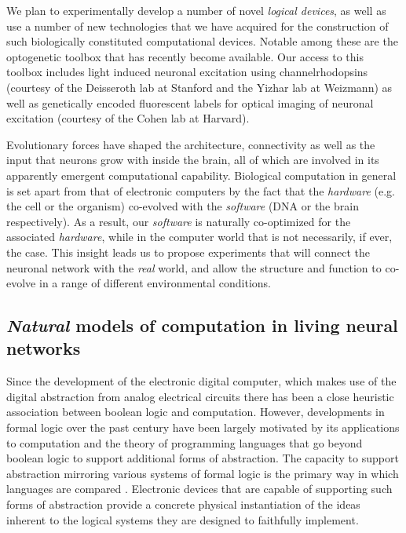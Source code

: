 We plan to experimentally develop a number of novel {\it logical devices}, as well as use a number of new technologies that we have acquired for the construction of such biologically constituted computational devices. Notable among these are the optogenetic toolbox that has recently become available. Our access to this toolbox includes light induced neuronal excitation using channelrhodopsins (courtesy of the Deisseroth lab at Stanford and the Yizhar lab at Weizmann) as well as genetically encoded fluorescent labels for optical imaging of neuronal excitation (courtesy of the Cohen lab at Harvard).

Evolutionary forces have shaped the architecture, connectivity as well as the input that neurons grow with inside the brain, all of which are involved in its apparently emergent computational capability. Biological computation in general is set apart from that of electronic computers by the fact that the {\it hardware} (e.g. the cell or the organism) co-evolved with the {\it software} (DNA or the brain respectively). As a result, our {\it software} is naturally co-optimized for the associated {\it hardware}, while in the computer world that is not necessarily, if ever, the case. This insight leads us to propose experiments that will connect the neuronal network with the {\it real} world, and  allow the structure and function to co-evolve in a range of different environmental conditions.

\subsection{\emph{Natural} models of computation in living neural networks}

Since the development of the electronic digital computer, which makes
use of the digital abstraction \cite{Ward1989} from analog electrical circuits
there has been a close heuristic association between boolean logic and
computation. However, developments in formal logic over the past century
have been largely motivated by its applications to computation and the
theory of programming languages that go beyond boolean logic to support additional forms of abstraction. The capacity to support abstraction mirroring various systems of
formal logic is the primary way in which languages are compared \cite{Abelson1996}. Electronic devices that are capable
of supporting such forms of abstraction provide a concrete physical
instantiation of the ideas inherent to the logical systems they are
designed to faithfully implement.

